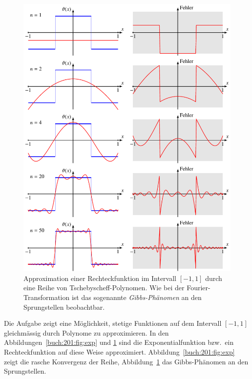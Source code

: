 \begin{figure}
\centering
\includegraphics{chapters/020-orthofkt/images/chebrect.pdf}
\caption{Approximation einer Rechteckfunktion im Intervall
$[-1,1]$ durch eine Reihe von Tschebyscheff-Polynomen.
Wie bei der Fourier-Transformation ist das sogenannte {\em Gibbs-Phänomen}
%
an den Sprungstellen beobachtbar.
\label{buch:201:fig:rect}}
\end{figure}

Die Aufgabe zeigt eine Möglichkeit, stetige Funktionen auf dem Intervall
$[-1,1]$ gleichmässig durch Polynome zu approximieren.
In den Abbildungen~\ref{buch:201:fig:exp} und \ref{buch:201:fig:rect}
sind die Exponentialfunktion bzw.~ein Rechteckfunktion auf diese
Weise approximiert.
Abbildung~\ref{buch:201:fig:exp} zeigt die rasche Konvergenz
der Reihe,
Abbildung~\ref{buch:201:fig:rect} das Gibbs-Phänomen an den
Sprungstellen.



